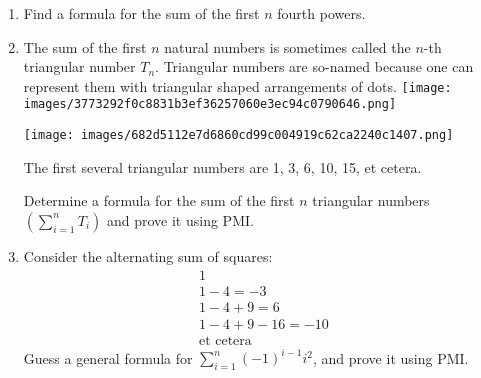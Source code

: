 \documentclass[10pt,]{book}
\theoremstyle{plain}
\theoremstyle{definition}
\theoremstyle{definition}
\numberwithin{equation}{section}
\newcommand{\hint}[1]{ }
\begin{document}
\begin{enumerate}[label=(\alph*)]
{\begin{proof}
            Thus
            \begin{gather*}
\sum_{k=1}^{m+1} k^3 \;= \; \left( \frac{m^2(m+1)^2}{4} \right) + \frac{4(m+1)^3}{4}\\
\;= \; \left( \frac{m^2(m+1)^2 + 4 (m+1)^3}{4} \right)\\
\; = \; \left( \frac{(m+1)^2 (m^2 + 4(m+1))}{4} \right)\\
\; = \; \left( \frac{(m+1)^2 (m^2 + 4m +4)}{4} \right)\\
\; = \; \left( \frac{(m+1)^2 (m+2)^2}{4} \right)\\
\; = \; \left( \frac{(m+1)(m+2)}{2} \right)^2
\end{gather*}
\end{proof}


        }
\item\hypertarget{li-371}{}
          Find a formula for the sum of the first \(n\) fourth powers.

          \hint{
          \begin{equation*}
            \frac{n\cdot(n+1)\cdot(2n+1)\cdot(3n^2+3n-1)}{30}
          \end{equation*}
          }
\item\hypertarget{li-372}{}
          The sum of the first \(n\) natural numbers is sometimes called
          the \(n\)-th triangular number \(T_n\).  Triangular numbers are so-named
          because one can represent them with triangular shaped arrangements 
          of dots.
          \texttt{[image: images/3773292f0c8831b3ef36257060e3ec94c0790646.png]}

          \ifx\SetFigFont\undefined\gdef\SetFigFont#1#2#3#4#5{
            \reset@font\fontsize{#1}{#2pt}
            \fontfamily{#3}\fontseries{#4}\fontshape{#5}
            \selectfont}\fi
          \texttt{[image: images/682d5112e7d6860cd99c004919c62ca2240c1407.png]}

          The first several triangular numbers are 1, 3, 6, 10, 15, et cetera.

          Determine a formula for the sum of the first \(n\) triangular numbers \(\displaystyle \left( \sum_{i=1}^n T_i \right)\) and prove it using PMI.

          \hint{The formula is \(\frac{n(n+1)(n+2)}{6}\).}
\item\hypertarget{li-373}{}
        Consider the alternating sum of squares:
        \begin{gather*}
1\\
1 - 4 = -3\\
1 - 4 + 9 = 6\\
1 - 4 + 9 - 16 = -10\\
\mbox{et cetera}
\end{gather*}
        Guess a general formula for \(\sum_{i=1}^n (-1)^{i-1} i^2\), and prove it using PMI.


\end{enumerate}
\end{document}
